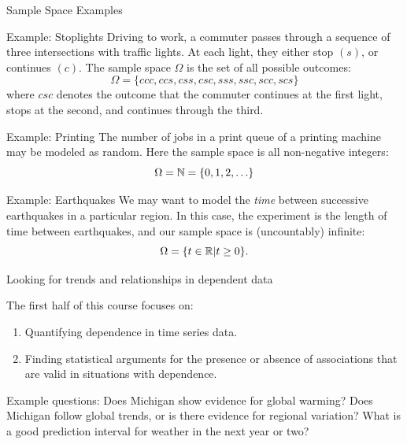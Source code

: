 \begin{frame}[allowframebreaks]{Sample Space Examples}
  \begin{exampleblock}{Example: Stoplights}
    Driving to work, a commuter passes through a sequence of three intersections with traffic lights. At each light, they either stop $(s)$, or continues $(c)$. The sample space $\Omega$ is the set of all possible outcomes: 
    $$
    \Omega = \{ccc, ccs, css, csc, sss, ssc, scc, scs\}
    $$
    where $csc$ denotes the outcome that the commuter continues at the first light, stops at the second, and continues through the third.
  \end{exampleblock}
  
    \begin{exampleblock}{Example: Printing}
      The number of jobs in a print queue of a printing machine may be modeled as random. Here the sample space is all non-negative integers: 
      $$\Omega = \mathbb{N} = \{0, 1, 2, \ldots\}$$
    \end{exampleblock}

  \begin{exampleblock}{Example: Earthquakes}
    We may want to model the \emph{time} between successive earthquakes in a particular region. In this case, the experiment is the length of time between earthquakes, and our sample space is (uncountably) infinite: 
    $$
    \Omega = \{t \in \mathbb{R}| t \geq 0\}. 
    $$
  \end{exampleblock}
\end{frame}

\begin{frame}{Looking for trends and relationships in dependent data}

The first half of this course focuses on:

\begin{enumerate}

\item Quantifying dependence in time series data.

\item Finding statistical arguments for the presence or absence of associations that are valid in situations with dependence.

\end{enumerate}

Example questions: Does Michigan show evidence for global warming? Does Michigan follow global trends, or is there evidence for regional variation? What is a good prediction interval for weather in the next year or two?

\end{frame}


